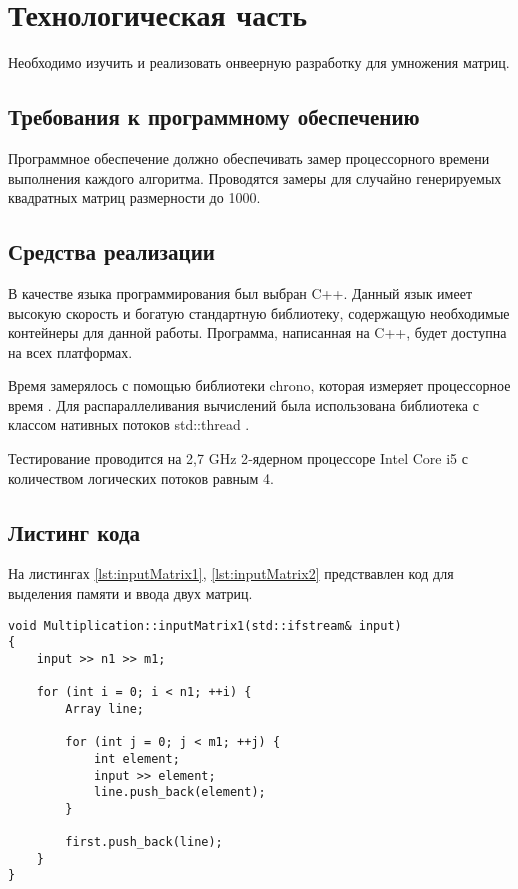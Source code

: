 \newpage
\section{Технологическая часть}

Необходимо изучить и реализовать онвеерную разработку для умножения матриц.

\subsection{Требования к программному обеспечению}

Программное обеспечение должно обеспечивать замер процессорного времени выполнения
каждого алгоритма. Проводятся замеры для случайно генерируемых квадратных матриц
размерности до 1000.

\subsection{Средства реализации}

В качестве языка программирования был выбран {\ttfamily C++}.
Данный язык имеет высокую скорость и богатую стандартную библиотеку,
содержащую необходимые контейнеры для данной работы. Программа, написанная на
{\ttfamily C++}, будет доступна на всех платформах.

Время замерялось с помощью библиотеки {\ttfamily chrono}, которая измеряет
процессорное время \cite{chrono}. Для распараллеливания вычислений была
использована библиотека с классом нативных потоков
{\ttfamily std::thread} \cite{thread}.

Тестирование проводится на 2,7 GHz 2‑ядерном процессоре Intel Core i5 с количеством логических потоков равным 4.

\subsection{Листинг кода}

На листингах \ref{lst:inputMatrix1}, \ref{lst:inputMatrix2} предствавлен код для
выделения памяти и ввода двух матриц.

\begin{lstlisting}[caption=Ввод первой матрицы,label=lst:inputMatrix1]
void Multiplication::inputMatrix1(std::ifstream& input)
{
    input >> n1 >> m1;

    for (int i = 0; i < n1; ++i) {
        Array line;

        for (int j = 0; j < m1; ++j) {
            int element;
            input >> element;
            line.push_back(element);
        }

        first.push_back(line);
    }
}
\end{lstlisting}

